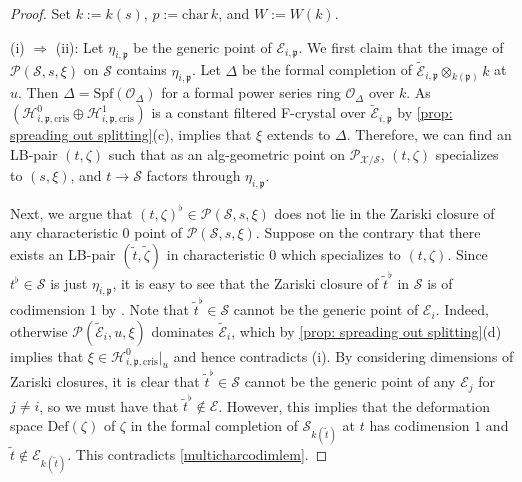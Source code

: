 \documentclass[letter, 11pt]{article}
\theoremstyle{plain}
\theoremstyle{definition}
\newcommand\tensor{{\otimes}}
\newcommand{\<}{\langle}
\renewcommand{\>}{\rangle}
\def\wt{\widetilde}
\newcommand{\fp}{\mathfrak{p}}
\newcommand{\sH}{\mathcal{H}}
\newcommand{\sX}{\mathcal{X}}
\newcommand{\sS}{\mathcal{S}}
\newcommand{\sE}{\mathcal{E}}
\newcommand{\sO}{\mathcal{O}}
\newcommand{\Spf}{\mathrm{Spf}}
\newcommand{\shP}{\mathscr{P}}
\newcommand{\Def}{\mathrm{Def}}
\newcommand{\cris}{\mathrm{cris}}
\begin{document}
\begin{proof} Set $k:= k(s)$, $p := \mathrm{char\,}k$, and $W := W(k)$.


    (i) $\Rightarrow$ (ii): Let $\eta_{i, \fp}$ be the generic point of $\sE_{i, \fp}$. We first claim that the image of $\shP(\sS, s, \xi)$ on $\sS$ contains $\eta_{i, \fp}$. Let $\Delta$ be the formal completion of $\wt{\sE}_{i, \fp} \tensor_{k(\fp)} k$ at $u$. Then $\Delta = \Spf(\sO_\Delta)$ for a formal power series ring $\sO_\Delta$ over $k$. As $(\sH^0_{i, \fp, \cris} \oplus \sH^1_{i, \fp, \cris})$ is a constant filtered F-crystal over $\wt{\sE}_{i, \fp}$ by \ref{prop: spreading out splitting}(c), \cite[Cor.~1.13]{OgusCrystals} implies that $\xi$ extends to $\Delta$. Therefore, we can find an LB-pair $(t, \zeta)$ such that as an alg-geometric point on $\shP_{\sX/\sS}$, $(t, \zeta)$ specializes to $(s, \xi)$, and $t \to \sS$ factors through $\eta_{i, \fp}$. 
    
    Next, we argue that $(t, \zeta)^\flat \in \shP(\sS, s, \xi)$ does not lie in the Zariski closure of any characteristic $0$ point of $\shP(\sS, s, \xi)$. Suppose on the contrary that there exists an LB-pair $(\wt{t}, \wt{\zeta})$ in characteristic $0$ which specializes to $(t, \zeta)$. Since $t^\flat \in \sS$ is just $\eta_{i, \fp}$, it is easy to see that the Zariski closure of $\wt{t}^\flat$ in $\sS$ is of codimension $1$ by \cite[0B2J]{stacks-project}. Note that $\wt{t}^\flat \in \sS$ cannot be the generic point of $\sE_{i}$. Indeed, otherwise $\shP(\wt{\sE}_{i}, u, \xi)$ dominates $\wt{\sE}_i$, which by \ref{prop: spreading out splitting}(d) implies that $\xi \in \sH^0_{i, \fp, \cris}|_u$ and hence contradicts (i). By considering dimensions of Zariski closures, it is clear that $\wt{t}^\flat \in \sS$ cannot be the generic point of any $\sE_j$ for $j \neq i$, so we must have that $\wt{t}^\flat \not\in \sE$. However, this implies that the deformation space $\Def(\zeta)$ of $\zeta$ in the formal completion of $\sS_{k(\wt{t})}$ at $t$ has codimension $1$ and $\wt{t} \not\in \sE_{k(\wt{t})}$. This contradicts \ref{multicharcodimlem}.


\end{proof}
\end{document}
